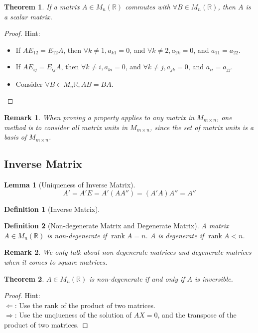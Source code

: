 \documentclass[onecolumn]{ctexart}
\newtheorem{definition}{Definition}
\newtheorem{theorem}{Theorem}
\newtheorem{lemma}{Lemma}
\newtheorem{remark}{Remark}
\DeclareMathOperator{\rank}{rank}
\begin{document}
\begin{theorem}
  If a matrix $A \in M_n(\mathbb{R})$ commutes with $\forall B \in 
  M_n(\mathbb{R})$, then $A$ is a scalar matrix.
\end{theorem}
\begin{proof}
  Hint:
  \begin{itemize}
    \item If $AE_{12} = E_{12}A$, then $\forall k \neq 1, a_{k1} = 0$, and 
    $\forall k \neq 2, a_{2k} = 0$, and $a_{11} = a_{22}$.
    \item If $AE_{ij} = E_{ij}A$, then $\forall k \neq i, a_{ki} = 0$, and 
    $\forall k \neq j, a_{jk} = 0$, and $a_{ii} = a_{jj}$.
    \item Consider $\forall B \in M_n{\mathbb{R}}, AB = BA$.
  \end{itemize}
\end{proof}
\begin{remark}
  When proving a property applies to any matrix in $M_{m \times n}$, one method 
  is to consider all matrix units in $M_{m \times n}$, since the set of matrix 
  units is a basis of $M_{m \times n}$.
\end{remark}

\subsection{Inverse Matrix}
\begin{lemma}[Uniqueness of Inverse Matrix]
  \[
    A' = A'E = A'(AA'') = (A'A)A'' = A''
  \]
\end{lemma}
\begin{definition}[Inverse Matrix]
  
\end{definition}

\begin{definition}[Non-degenerate Matrix and Degenerate Matrix]
  A matrix $A \in M_n(\mathbb{R})$ is non-degenerate if $\rank A = n$. $A$ is 
  degenerate if $\rank A < n$.
\end{definition}
\begin{remark}
  We only talk about non-degenerate matrices and degenerate matrices when it 
  comes to square matrices.
\end{remark}

\begin{theorem}
  $A \in M_n(\mathbb{R})$ is non-degenerate if and only if $A$ is inversible.
\end{theorem}
\begin{proof}
  Hint: \\
  $\Leftarrow$: Use the rank of the product of two matrices. \\
  $\Rightarrow$: Use the unqiueness of the solution of $AX = 0$, and the 
  transpose of the product of two matrices.
\end{proof}
\end{document}
